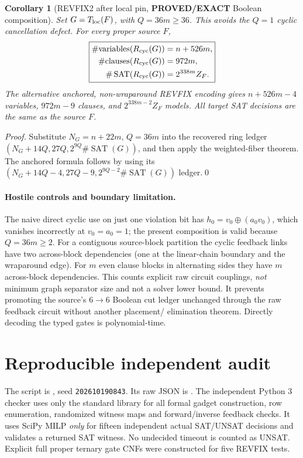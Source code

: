 \documentclass[11pt]{article}
\newtheorem{corollary}[theorem]{Corollary}
\newcommand{\SAT}{\operatorname{SAT}}
\newcommand{\EXACT}{\textbf{PROVED/EXACT}}
\begin{document}
\begin{corollary}[REVFIX2 after local pin, \EXACT{} Boolean composition]
Set $G=T_{\rm loc}(F)$, with $Q=36m\ge36$.  This avoids the $Q=1$ cyclic
cancellation defect.  For every proper source $F$,
\[
\boxed{\begin{aligned}
\#\mathrm{variables}(R_{\rm cyc}(G))&=n+526m,\\
\#\mathrm{clauses}(R_{\rm cyc}(G))&=972m,\\
\#\SAT(R_{\rm cyc}(G))&=2^{338m}Z_F.
\end{aligned}}
\]
The alternative anchored, non-wraparound REVFIX encoding gives
$n+526m-4$ variables, $972m-9$ clauses, and $2^{338m-2}Z_F$ models.
All target SAT decisions are the same as the source $F$.
\end{corollary}
\begin{proof}
Substitute $N_G=n+22m$, $Q=36m$ into the recovered ring ledger
$(N_G+14Q,27Q,2^{9Q}\#\SAT(G))$, and then apply the weighted-fiber
theorem.  The anchored formula follows by using its
$(N_G+14Q-4,27Q-9,2^{9Q-2}\#\SAT(G))$ ledger.\qed
\end{proof}

\paragraph{Hostile controls and boundary limitation.}
The naive direct cyclic use on just one violation bit has
$h_0=v_0\oplus(a_0 v_0)$, which vanishes incorrectly at
$v_0=a_0=1$; the present composition is valid because $Q=36m\ge2$.
For a contiguous source-block partition the cyclic feedback links have
two across-block dependencies (one at the linear-chain boundary and the
wraparound edge).  For $m$ even clause blocks in alternating sides they
have $m$ across-block dependencies.  This counts explicit raw circuit
couplings, \emph{not} minimum graph separator size and not a solver lower
bound.  It prevents promoting the source's $6\to6$ Boolean cut ledger
unchanged through the raw feedback circuit without another placement/
elimination theorem.  Directly decoding the typed gates is polynomial-time.

\section{Reproducible independent audit}
The script is
,
seed \texttt{202610190843}.  Its raw JSON is
.
The independent Python 3 checker uses only the standard library for all
formal gadget construction, row enumeration, randomized witness maps and
forward/inverse feedback checks.  It uses SciPy MILP \emph{only} for fifteen
independent actual SAT/UNSAT decisions and validates a returned SAT witness.
No undecided timeout is counted as UNSAT.  Explicit full proper ternary gate
CNFs were constructed for five REVFIX tests.
\end{document}
